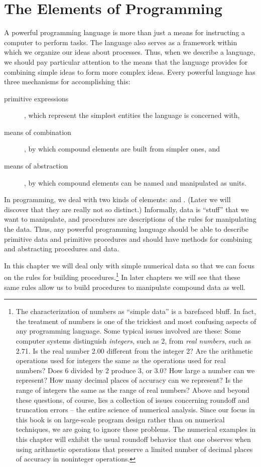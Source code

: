 \section{The Elements of Programming}
\label{sec:1.1}

A powerful programming language is more than just a means for
instructing a computer to perform tasks.  The language also serves as
a framework within which we organize our ideas about processes.  Thus,
when we describe a language, we should pay particular attention to the
means that the language provides for combining simple ideas to form
more complex ideas.  Every powerful language has three mechanisms for
accomplishing this:

\begin{description}
\item[primitive expressions], which represent the simplest entities
  the language is concerned with,
\item[means of combination], by which compound elements are built from
  simpler ones, and
\item[means of abstraction], by which compound elements can be named
  and manipulated as units.
\end{description}


In programming, we deal with two kinds of elements: 
and . (Later we will discover that they are really not so
distinct.)  Informally, data is ``stuff'' that we want to manipulate,
and procedures are descriptions of the rules for manipulating the
data.  Thus, any powerful programming language should be able to
describe primitive data and primitive procedures and should have
methods for combining and abstracting procedures and data.

In this chapter we will deal only with simple numerical data so that
we can focus on the rules for building procedures.\footnote{The
  characterization of numbers as ``simple data'' is a barefaced bluff.
  In fact, the treatment of numbers is one of the trickiest and most
  confusing aspects of any programming language.  Some typical issues
  involved are these: Some computer systems distinguish
  \textit{integers}, such as 2, from \textit{real numbers}, such as
  2.71.  Is the real number 2.00 different from the integer 2?  Are
  the arithmetic operations used for integers the same as the
  operations used for real numbers?  Does 6 divided by 2 produce 3, or
  3.0?  How large a number can we represent?  How many decimal places
  of accuracy can we represent?  Is the range of integers the same as
  the range of real numbers?  Above and beyond these questions, of
  course, lies a collection of issues concerning roundoff and
  truncation errors -- the entire science of numerical analysis.
  Since our focus in this book is on large-scale program design rather
  than on numerical techniques, we are going to ignore these problems.
  The numerical examples in this chapter will exhibit the usual
  roundoff behavior that one observes when using arithmetic operations
  that preserve a limited number of decimal places of accuracy in
  noninteger operations.} In later chapters we will see that these
same rules allow us to build procedures to manipulate compound data as
well.

